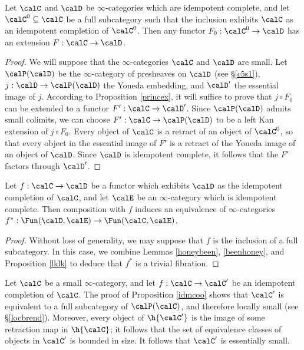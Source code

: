 \begin{lemma}\label{beenhoney}
Let $\calC$ and $\calD$ be $\infty$-categories which are idempotent complete, and let
$\calC^{0} \subseteq \calC$ be a full subcategory such that the inclusion exhibits
$\calC$ as an idempotent completion of $\calC^{0}$. Then any functor
$F_0: \calC^{0} \rightarrow \calD$ has an extension $F: \calC \rightarrow \calD$.
\end{lemma}

\begin{proof}
We will suppose that the $\infty$-categories $\calC$ and $\calD$ are small. Let $\calP(\calD)$ be the $\infty$-category of presheaves on $\calD$ (see \S \ref{c5s1}), $j: \calD \rightarrow \calP(\calD)$ the Yoneda embedding, and $\calD'$ the essential image of $j$. According to Proposition \ref{princex}, it will suffice to prove that $j \circ F_0$ can be extended to a functor $F': \calC \rightarrow \calD'$.
Since $\calP(\calD)$ admits small colimits, we can choose $F': \calC \rightarrow \calP(\calD)$
to be a left Kan extension of $j \circ F_0$. Every object of $\calC$ is a retract of an object of $\calC^{0}$, so that every object in the essential image of $F'$ is a retract of the Yoneda image of an object of $\calD$. Since $\calD$ is idempotent complete, it follows that the $F'$ factors through $\calD'$.
\end{proof}

\begin{proposition}\label{charidemcomp}
Let $f: \calC \rightarrow \calD$ be a functor which exhibits $\calD$ as the idempotent completion of $\calC$, and let $\calE$ be an $\infty$-category which is idempotent complete. Then composition with $f$ induces an equivalence of $\infty$-categories
 $f^{\ast}: \Fun(\calD, \calE) \rightarrow \Fun(\calC, \calE)$.
\end{proposition}

\begin{proof}
Without loss of generality, we may suppose that $f$ is the inclusion of a full subcategory. In this case, we combine Lemmas \ref{honeybeen}, \ref{beenhoney}, and Proposition \ref{lklk} to deduce that $f^{\ast}$ is a trivial fibration.
\end{proof}

\begin{remark}
Let $\calC$ be a small $\infty$-category, and let $f: \calC \rightarrow \calC'$ be an idempotent completion of $\calC$. The proof of Proposition \ref{idmcoo} shows that $\calC'$ is equivalent to a full subcategory of $\calP(\calC)$, and therefore locally small (see \S \ref{locbrend}). Moreover, every object of $\h{\calC'}$ 
is the image of some retraction map in $\h{\calC}$; it follows that the set of equivalence classes of objects in $\calC'$ is bounded in size. It follows that $\calC'$ is essentially small.
\end{remark}

